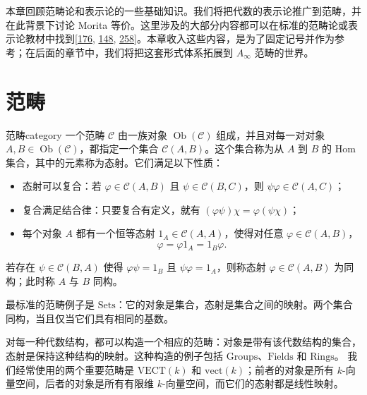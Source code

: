本章回顾范畴论和表示论的一些基础知识。我们将把代数的表示论推广到范畴，并在此背景下讨论 Morita 等价。这里涉及的大部分内容都可以在标准的范畴论或表示论教材中找到[\hyperlink{ref:176}{176}, \hyperlink{ref:148}{148}, \hyperlink{ref:258}{258}]。本章收入这些内容，是为了固定记号并作为参考；在后面的章节中，我们将把这套形式体系拓展到 $A_\infty$ 范畴的世界。

\section{范畴}\label{sec:categories}
\begin{definition}{范畴}{category}
一个范畴 $\mathcal C$ 由一族对象 $\operatorname{Ob}(\mathcal C)$ 组成，并且对每一对对象 $A,B\in\operatorname{Ob}(\mathcal C)$，都指定一个集合 $\mathcal C(A,B)$。这个集合称为从 $A$ 到 $B$ 的 Hom 集合，其中的元素称为态射。它们满足以下性质：
\begin{itemize}
  \item 态射可以复合：若 $\varphi\in\mathcal C(A,B)$ 且 $\psi\in\mathcal C(B,C)$，则 $\psi\varphi\in\mathcal C(A,C)$；
  \item 复合满足结合律：只要复合有定义，就有 $(\varphi\psi)\chi=\varphi(\psi\chi)$；
  \item 每个对象 $A$ 都有一个恒等态射 $1_A\in\mathcal C(A,A)$，使得对任意 $\varphi\in\mathcal C(A,B)$，
  \[
    \varphi=\varphi 1_A=1_B\varphi.
  \]
\end{itemize}
若存在 $\psi\in\mathcal C(B,A)$ 使得 $\varphi\psi=1_B$ 且 $\psi\varphi=1_A$，则称态射 $\varphi\in\mathcal C(A,B)$ 为同构；此时称 $A$ 与 $B$ 同构。
\end{definition}

\begin{example}[集合范畴]\label{ex:sets}
最标准的范畴例子是 $\mathrm{Sets}$：它的对象是集合，态射是集合之间的映射。两个集合同构，当且仅当它们具有相同的基数。
\end{example}

\begin{example}[来自代数的例子]\label{ex:algebra-categories}
对每一种代数结构，都可以构造一个相应的范畴：对象是带有该代数结构的集合，态射是保持这种结构的映射。这种构造的例子包括 $\mathrm{Groups}$、$\mathrm{Fields}$ 和 $\mathrm{Rings}$。
我们经常使用的两个重要范畴是 $\mathrm{VECT}(k)$ 和 $\mathrm{vect}(k)$；前者的对象是所有 $k$-向量空间，后者的对象是所有有限维 $k$-向量空间，而它们的态射都是线性映射。
\end{example}

